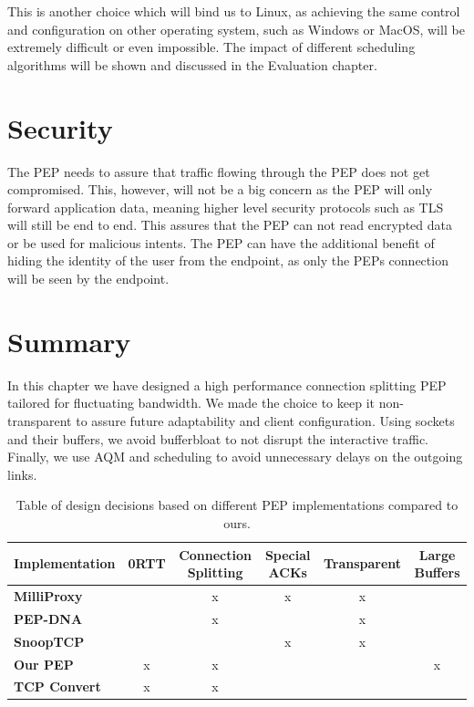 \documentclass[a4paper,english, 12pt]{report}
\begin{document}
This is another choice which will bind us to Linux, as achieving the same control and configuration on other operating system, such as Windows or MacOS, will be extremely difficult or even impossible. The impact of different scheduling algorithms will be shown and discussed in the Evaluation chapter.

\section{Security}
The PEP needs to assure that traffic flowing through the PEP does not get compromised. This, however, will not be a big concern as the PEP will only forward application data, meaning higher level security protocols such as TLS will still be end to end. This assures that the PEP can not read encrypted data or be used for malicious intents. The PEP can have the additional benefit of hiding the identity of the user from the endpoint, as only the PEPs connection will be seen by the endpoint.

\section{Summary}
In this chapter we have designed a high performance connection splitting PEP tailored for fluctuating bandwidth. We made the choice to keep it non-transparent to assure future adaptability and client configuration. Using sockets and their buffers, we avoid bufferbloat to not disrupt the interactive traffic. Finally, we use AQM and scheduling to avoid unnecessary delays on the outgoing links.\\

\begin{table}[h!]
\centering
\begin{tabularx}{\linewidth}{lCCCCC}
\toprule
Implementation & 0RTT & Connection Splitting & Special ACKs & Transparent & Large Buffers \\
\midrule
\textbf{MilliProxy} &  & x & x & x &  \\
\textbf{PEP-DNA} &  & x &  & x &  \\
\textbf{SnoopTCP} &  &  & x & x &  \\
\textbf{Our PEP} & x & x &  &  & x \\
\textbf{TCP Convert} & x & x &  &  &  \\
\bottomrule
\end{tabularx}
\caption{Table of design decisions based on different PEP implementations compared to ours.}
\label{tab:summary}
\end{table}
\end{document}
